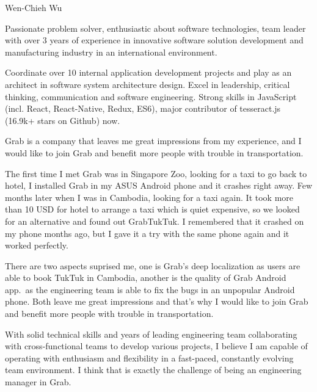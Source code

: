\documentclass[11pt, a4paper]{awesome-cv}
\begin{document}
\makecvheader[R]

\makecvfooter
  {}
  {Wen-Chieh Wu}
  {}

\makelettertitle

\begin{cvletter}

Passionate problem solver, enthusiastic about software technologies, team leader with over 3 years of experience in innovative software solution development and manufacturing industry in an international environment.

Coordinate over 10 internal application development projects and play as an architect in software system architecture design. Excel in leadership, critical thinking, communication and software engineering. Strong skills in JavaScript (incl. React, React-Native, Redux, ES6), major contributor of tesseract.js (16.9k+ stars on Github) now.

Grab is a company that leaves me great impressions from my experience, and I would like to join Grab and benefit more people with trouble in transportation.

The first time I met Grab was in Singapore Zoo, looking for a taxi to go back to hotel, I installed Grab in my ASUS Android phone and it crashes right away. Few months later when I was in Cambodia, looking for a taxi again. It took more than 10 USD for hotel to arrange a taxi which is quiet expensive, so we looked for an alternative and found out GrabTukTuk. I remembered that it crashed on my phone months ago, but I gave it a try with the same phone again and it worked perfectly.

There are two aspects suprised me, one is Grab's deep localization as users are able to book TukTuk in Cambodia, another is the quality of Grab Android app.\ as the engineering team is able to fix the bugs in an unpopular Android phone. Both leave me great impressions and that's why I would like to join Grab and benefit more people with trouble in transportation.

With solid technical skills and years of leading engineering team collaborating with cross-functional teams to develop various projects, I believe I am capable of operating with enthusiasm and flexibility in a fast-paced, constantly evolving team environment. I think that is exactly the challenge of being an engineering manager in Grab.

\end{cvletter}


\makeletterclosing
\end{document}
